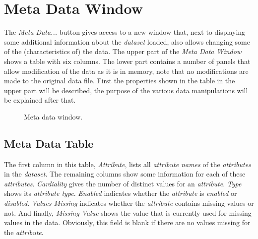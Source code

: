 \documentclass{article}
\begin{document}
\section{Meta Data Window}
\label{section:meta-data-window}
The \emph{Meta Data...} button gives access to a new window that, next to displaying some additional information about the \emph{dataset} loaded, also allows changing some of the (characteristics of) the data.
The upper part of the \emph{Meta Data Window} shows a table with six columns.
The lower part contains a number of panels that allow modification of the data as it is in memory, note that no modifications are made to the original data file.
First the properties shown in the table in the upper part will be described, the purpose of the various data manipulations will be explained after that.

\begin{figure}
\begin{center}
\centering
{}
\caption{Meta data window.}
\end{center}
\label{fig:metadatawindow}
\end{figure}



\subsection{Meta Data Table}
\label{meta-data-window:meta-data-table}
The first column in this table, \emph{Attribute}, lists all \emph{attribute names} of the \emph{attributes} in the \emph{dataset}.
The remaining columns show some information for each of these \emph{attributes}.
\emph{Cardiality} gives the number of distinct values for an \emph{attribute}.
\emph{Type} shows its \emph{attribute type}.
\emph{Enabled} indicates whether the \emph{attribute} is \emph{enabled} or \emph{disabled}.
\emph{Values Missing} indicates whether the \emph{attribute} contains missing values or not.
And finally, \emph{Missing Value} shows the value that is currently used for missing values in the data.
Obviously, this field is blank if there are no values missing for the \emph{attribute}.
\end{document}
